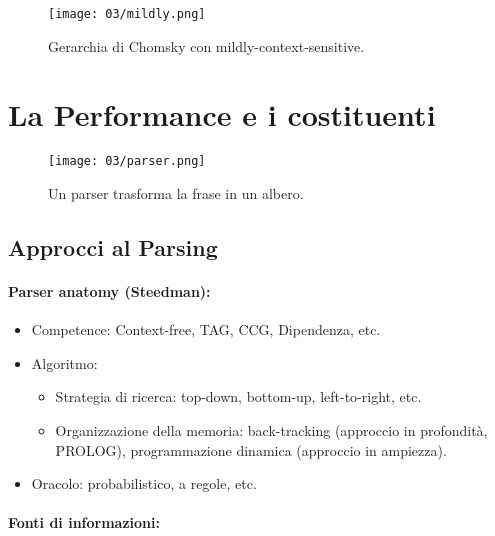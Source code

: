 
\begin{figure}[h]
    \centering
    \texttt{[image: 03/mildly.png]}
    \caption{Gerarchia di Chomsky con mildly-context-sensitive.}
\end{figure}
\pagebreak
\section{La Performance e i costituenti}

\begin{figure}[!h]
    \centering
    \texttt{[image: 03/parser.png]}
    \caption{Un parser trasforma la frase in un albero.}
\end{figure}

\subsection{Approcci al Parsing}

\paragraph{Parser anatomy (Steedman):}

\begin{itemize}
  \item Competence: Context-free, TAG, CCG, Dipendenza, etc.
  \item Algoritmo: 
    \begin{itemize}
      \item Strategia di ricerca: top-down, bottom-up, left-to-right, etc. 
      \item Organizzazione della memoria: back-tracking (approccio in profondità, PROLOG), programmazione dinamica (approccio in ampiezza).
    \end{itemize}
  \item Oracolo: probabilistico, a regole, etc.
\end{itemize}


\paragraph{Fonti di informazioni:}

